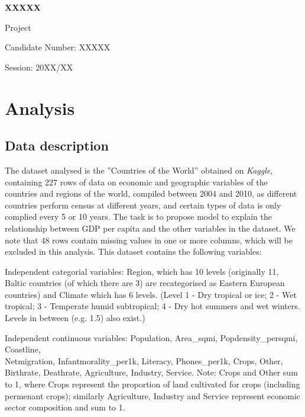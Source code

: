 \documentclass[12pt,a4paper]{article}
\renewcommand\texttt[1]{{\ttfamily\color{ttcolor}#1}}
\begin{document}
\begin{titlepage}
\vspace*{1cm}
\begin{center}
\Huge
\textbf{XXXXX}

\LARGE
Project

\vfill

\Large
Candidate Number: XXXXX

Session: 20XX/XX

\end{center}
\end{titlepage}
\section{Analysis}

\subsection{Data description}

The dataset analysed is the ''Countries of the World'' obtained on \textit{Kaggle}, containing 227 rows of data on economic and geographic variables of the countries and regions of the world, compiled between 2004 and 2010, as different countries perform census at different years, and certain types of data is only complied every 5 or 10 years.  The task is to propose model to explain the relationship between GDP per capita and the other variables in the dataset. We note that 48 rows contain missing values in one or more columns, which will be excluded in this analysis. This dataset contains the following variables:

Independent categorial variables: \texttt{Region}, which has 10 levels (originally 11, Baltic countries (of which there are 3) are recategorised as Eastern European countries) and \texttt{Climate} which has 6 levels. (Level 1 - Dry tropical or ice; 2 - Wet tropical; 3 - Temperate humid subtropical; 4 - Dry hot summers and wet winters. Levels in between (e.g. 1.5) also exist.)

Independent continuous variables: \texttt{Population}, \texttt{Area\_sqmi}, \texttt{Popdensity\_persqmi}, \texttt{Coastline},\\
 \texttt{Netmigration}, \texttt{Infantmorality\_per1k}, \texttt{Literacy}, \texttt{Phones\_per1k}, \texttt{Crops}, \texttt{Other}, \\
 \texttt{Birthrate}, \texttt{Deathrate}, \texttt{Agriculture}, \texttt{Industry}, \texttt{Service}. Note: \texttt{Crops} and \texttt{Other} sum to 1, where \texttt{Crops} represent the proportion of land cultivated for crops (including permenant crops);  similarly \texttt{Agriculture}, \texttt{Industry} and \texttt{Service} represent economic sector composition and sum to 1. 
\end{document}
